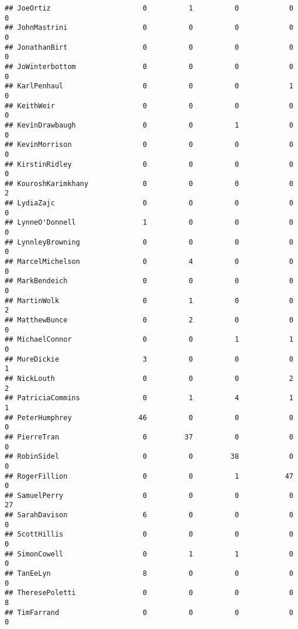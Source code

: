 \documentclass[
  12pt,
]{article}
\begin{document}
\begin{verbatim}
## JoeOrtiz                      0          1          0            0           0
## JohnMastrini                  0          0          0            0           0
## JonathanBirt                  0          0          0            0           0
## JoWinterbottom                0          0          0            0           0
## KarlPenhaul                   0          0          0            1           0
## KeithWeir                     0          0          0            0           0
## KevinDrawbaugh                0          0          1            0           0
## KevinMorrison                 0          0          0            0           0
## KirstinRidley                 0          0          0            0           0
## KouroshKarimkhany             0          0          0            0           2
## LydiaZajc                     0          0          0            0           0
## LynneO'Donnell                1          0          0            0           0
## LynnleyBrowning               0          0          0            0           0
## MarcelMichelson               0          4          0            0           0
## MarkBendeich                  0          0          0            0           0
## MartinWolk                    0          1          0            0           2
## MatthewBunce                  0          2          0            0           0
## MichaelConnor                 0          0          1            1           0
## MureDickie                    3          0          0            0           1
## NickLouth                     0          0          0            2           2
## PatriciaCommins               0          1          4            1           1
## PeterHumphrey                46          0          0            0           0
## PierreTran                    0         37          0            0           0
## RobinSidel                    0          0         38            0           0
## RogerFillion                  0          0          1           47           0
## SamuelPerry                   0          0          0            0          27
## SarahDavison                  6          0          0            0           0
## ScottHillis                   0          0          0            0           0
## SimonCowell                   0          1          1            0           0
## TanEeLyn                      8          0          0            0           0
## TheresePoletti                0          0          0            0           8
## TimFarrand                    0          0          0            0           0

\end{verbatim}
\end{document}
